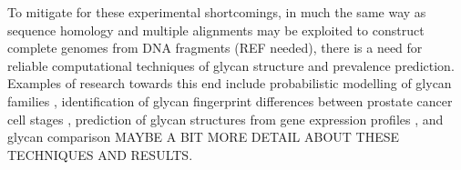 \documentclass[12pt,a4paper]{article}
\begin{document}
To mitigate for these experimental shortcomings, in much the same way as sequence homology and multiple alignments may be exploited to construct complete genomes from DNA fragments (REF needed), there is a need for reliable computational techniques of glycan structure and prevalence prediction. Examples of research towards this end include probabilistic modelling of glycan families \citep{ueda2005probabilistic}, identification of glycan fingerprint differences between prostate cancer cell stages \citep{10.1371/journal.pcbi.1002813}, prediction of glycan structures from gene expression profiles \citep{doi:10.1093/bioinformatics/bti666}, and glycan comparison \citep{aoki2004score, aoki2004kcam} MAYBE A BIT MORE DETAIL ABOUT THESE TECHNIQUES AND RESULTS.




\end{document}
